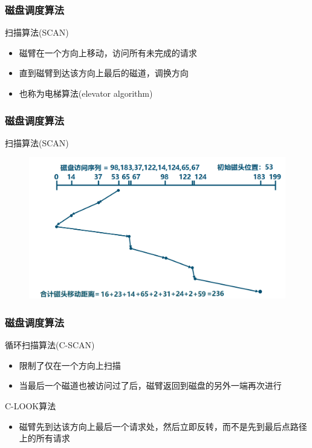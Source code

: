 \begin{frame}[fragile]
    \frametitle{磁盘调度算法}
    扫描算法(SCAN)
    \begin{itemize}
        \item 磁臂在一个方向上移动，访问所有未完成的请求
        \item 直到磁臂到达该方向上最后的磁道，调换方向
        \item 也称为电梯算法(elevator algorithm)

    \end{itemize}
\end{frame}

\begin{frame}[fragile]
    \frametitle{磁盘调度算法}
    扫描算法(SCAN)
%        
\begin{figure}
    \includegraphics[width=0.7\linewidth]{figs/disk-scan.png}
\end{figure}
\end{frame}
\begin{frame}[fragile]
    \frametitle{磁盘调度算法}
    循环扫描算法(C-SCAN)
    \begin{itemize}
        \item 限制了仅在一个方向上扫描
        \item 当最后一个磁道也被访问过了后，磁臂返回到磁盘的另外一端再次进行
   \end{itemize}
    C-LOOK算法
   \begin{itemize}
       \item 磁臂先到达该方向上最后一个请求处，然后立即反转，而不是先到最后点路径上的所有请求

    \end{itemize}
\end{frame}

